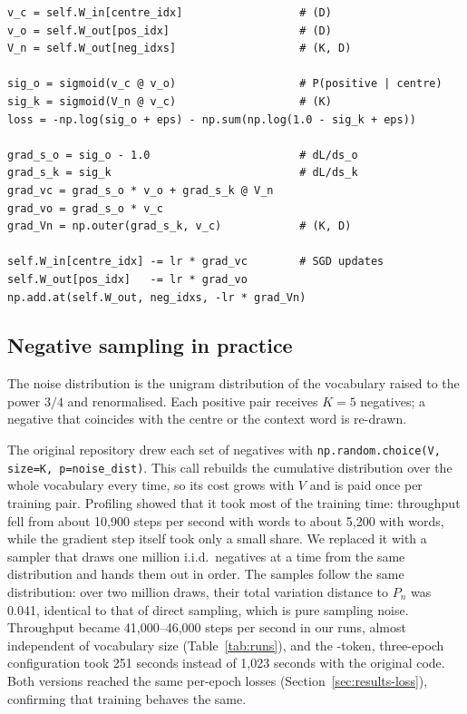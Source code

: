 \begin{lstlisting}[caption={One SGNS training step (\texttt{MyWord2Vec.step} in \texttt{src/model/word2vec.py}).}, label={lst:step}, float=t]
v_c = self.W_in[centre_idx]                  # (D)
v_o = self.W_out[pos_idx]                    # (D)
V_n = self.W_out[neg_idxs]                   # (K, D)

sig_o = sigmoid(v_c @ v_o)                   # P(positive | centre)
sig_k = sigmoid(V_n @ v_c)                   # (K)
loss = -np.log(sig_o + eps) - np.sum(np.log(1.0 - sig_k + eps))

grad_s_o = sig_o - 1.0                       # dL/ds_o
grad_s_k = sig_k                             # dL/ds_k
grad_vc = grad_s_o * v_o + grad_s_k @ V_n
grad_vo = grad_s_o * v_c
grad_Vn = np.outer(grad_s_k, v_c)            # (K, D)

self.W_in[centre_idx] -= lr * grad_vc        # SGD updates
self.W_out[pos_idx]   -= lr * grad_vo
np.add.at(self.W_out, neg_idxs, -lr * grad_Vn)
\end{lstlisting}

\subsection{Negative sampling in practice}
\label{sec:method-negatives}

The noise distribution is the unigram distribution of the vocabulary raised to the power $3/4$ and renormalised. Each positive pair receives $K = 5$ negatives; a negative that coincides with the centre or the context word is re-drawn.

The original repository drew each set of negatives with \texttt{np.random.choice(V, size=K, p=noise\_dist)}. This call rebuilds the cumulative distribution over the whole vocabulary every time, so its cost grows with $V$ and is paid once per training pair. Profiling showed that it took most of the training time: throughput fell from about 10,900 steps per second with \DemoVocab{} words to about 5,200 with \FinalVocab{} words, while the gradient step itself took only a small share. We replaced it with a sampler that draws one million i.i.d.\ negatives at a time from the same distribution and hands them out in order. The samples follow the same distribution: over two million draws, their total variation distance to $P_n$ was 0.041, identical to that of direct sampling, which is pure sampling noise. Throughput became 41,000--46,000 steps per second in our runs, almost independent of vocabulary size (Table~\ref{tab:runs}), and the \DemoTokensShort-token, three-epoch configuration took 251 seconds instead of 1,023 seconds with the original code. Both versions reached the same per-epoch losses (Section~\ref{sec:results-loss}), confirming that training behaves the same.

